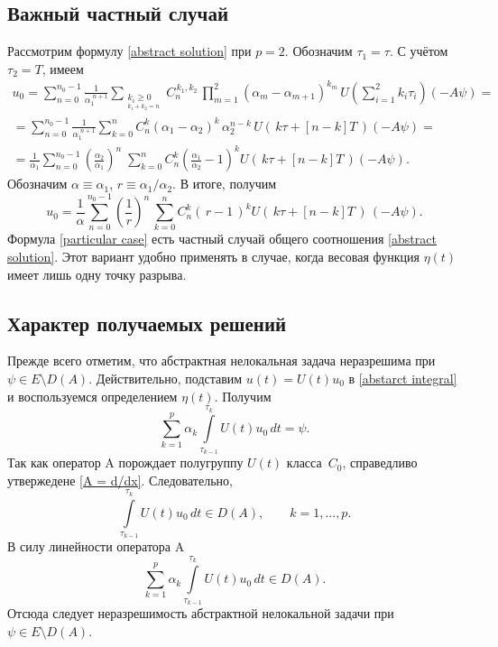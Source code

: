 \documentclass{article}
\renewcommand{\ge}{\geqslant}
\theoremstyle{definition}
\begin{document}
\subsection{Важный частный случай}
Рассмотрим формулу \eqref{abstract solution} при $p = 2$. 
Обозначим $ \tau_1 = \tau $. С учётом $\tau_2 = T$, имеем 
\begin{gather*}
	u_0 = \sum\limits_{n = 0}^{n_0 - 1} \frac{1}{\alpha_1^{\,\,n + 1}}\sum\limits_{\substack{{k_i \ge 0} \\_{k_1 + k_2 = n
	}}}C_n^{\,k_1,k_2}\,
	\prod_{m = 1}^{2}(\alpha_m - \alpha_{m + 1})^{k_m}\,U\!\left( \sum\limits_{i = 1}^{2}k_i\tau_i \right)(-A\psi) = \\[2mm]
	= \sum\limits_{n = 0}^{n_0 - 1} \frac{1}{\alpha_1^{\,\,n + 1}}
	\sum\limits_{k = 0}^n C_n^{k} (\alpha_1 - \alpha_2)^k\, \alpha_2^{n - k}\,U(\,k\tau + [n - k]T\,) (-A\psi) = \\[2mm]
	= \frac{1}{\alpha_1}\sum\limits_{n = 0}^{n_0 - 1} \left(\frac{\alpha_2}{\alpha_1}\right)^{\!\!n} \;
	\sum\limits_{k = 0}^n C_n^{k} \left(\frac{\alpha_1}{\alpha_2} - 1\right)^{\!k} \! U(\,k\tau + [n - k]T\,) (-A\psi).
\end{gather*}
Обозначим $ \alpha \equiv \alpha_1 $, $ r \equiv \alpha_1/\alpha_2 $. В итоге, получим
\begin{equation} \label{particular case}
	u_0 = \frac{1}{\alpha}\sum\limits_{n = 0}^{n_0 - 1} 
	\left( \frac{1}{r} \right)^{\!\!n}\,
	\sum_{k = 0}^{n}C_n^k \left(\, r - 1 \,\right)^k U(\, k\tau + [n - k]T \,)\, (-A\psi).
\end{equation}
Формула \eqref{particular case} есть частный случай общего соотношения \eqref{abstract solution}. Этот вариант
удобно применять в случае, когда весовая функция $\eta(t)$ имеет лишь одну точку разрыва.

\subsection{Характер получаемых решений}
Прежде всего отметим, что абстрактная нелокальная задача неразрешима при $ \psi \in E \setminus D(A) $. 
Действительно, подставим $ u(t) = U(t)u_0 $ в \eqref{abstarct integral} и воспользуемся определением $\eta(t)$. Получим
\begin{equation} \label{sum_int = psi}
	\sum\limits_{k = 1}^{p} \alpha_k \int\limits_{\tau_{k - 1}}^{\tau_k} U(t)u_0\,dt = \psi.
\end{equation}
Так как оператор A порождает полугруппу $U(t)$ класса~$C_0$, справедливо утвержедене \ref{A = d/dx}. 
Следовательно,
\begin{equation*}
	\int\limits_{\tau_{k - 1}}^{\tau_k} U(t)u_0\,dt \in D(A), \qquad k = 1, ..., p.
\end{equation*}
В силу линейности оператора A
\begin{equation*}
	\sum\limits_{k = 1}^{p} \alpha_k \int\limits_{\tau_{k - 1}}^{\tau_k} U(t)u_0\,dt \in D(A).
\end{equation*}
Отсюда следует неразрешимость абстрактной нелокальной задачи при $\psi \in E \setminus D(A)$.
\end{document}
